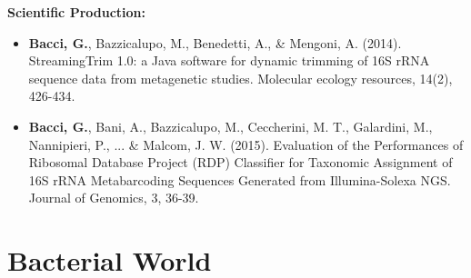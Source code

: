 \documentclass[10pt]{beamer}
\begin{document}
\begin{frame}
	\textbf{\Large{Scientific Production:}}
	\begin{itemize}
		\item \textbf{Bacci, G.}, Bazzicalupo, M., Benedetti, A., \& Mengoni, A. (2014). StreamingTrim 1.0: a Java software for dynamic trimming of 16S rRNA sequence data from metagenetic studies. Molecular ecology resources, 14(2), 426-434.
		\item \textbf{Bacci, G.}, Bani, A., Bazzicalupo, M., Ceccherini, M. T., Galardini, M., Nannipieri, P., ... \& Malcom, J. W. (2015). Evaluation of the Performances of Ribosomal Database Project (RDP) Classifier for Taxonomic Assignment of 16S rRNA Metabarcoding Sequences Generated from Illumina-Solexa NGS. Journal of Genomics, 3, 36-39.
	\end{itemize}
\end{frame}

\section{Bacterial World}
\end{document}
